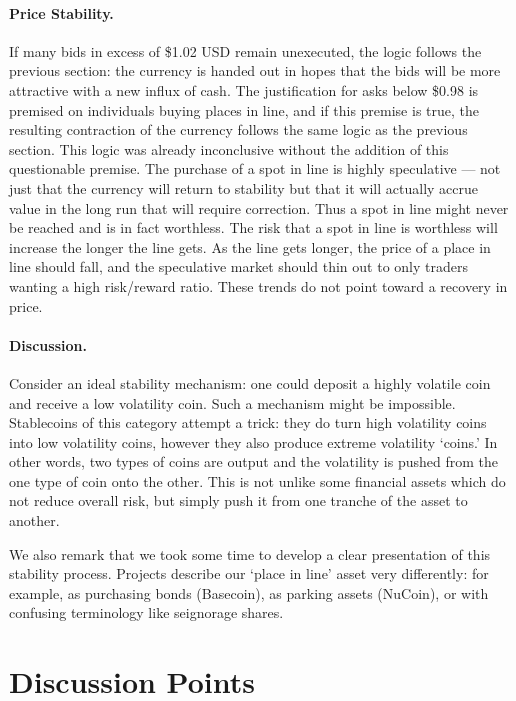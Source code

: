 \paragraph{Price Stability.} If many bids in excess of \$1.02 USD remain unexecuted, the logic follows the previous section: the currency is handed out in hopes that the bids will be more attractive with a new influx of cash. The justification for asks below \$0.98 is premised on individuals buying places in line, and if this premise is true, the resulting contraction of the currency follows the same logic as the previous section. This logic was already inconclusive without the addition of this questionable premise. The purchase of a spot in line is highly speculative --- not just that the currency will return to stability but that it will actually accrue value in the long run that will require correction. Thus a spot in line might never be reached and is in fact worthless. The risk that a spot in line is worthless will increase the longer the line gets. As the line gets longer, the price of a place in line should fall, and the speculative market should thin out to only traders wanting a high risk/reward ratio. These trends do not point toward a recovery in price. 

\paragraph{Discussion.} Consider an ideal stability mechanism: one could deposit a highly volatile coin and receive a low volatility coin. Such a mechanism might be impossible. Stablecoins of this category attempt a trick: they do turn high volatility coins into low volatility coins, however they also produce extreme volatility `coins.' In other words, two types of coins are output and the volatility is pushed from the one type of coin onto the other. This is not unlike some financial assets which do not reduce overall risk, but simply push it from one tranche of the asset to another.

We also remark that we took some time to develop a clear presentation of this stability process. Projects describe our `place in line' asset very differently: for example, as purchasing bonds (Basecoin), as parking assets (NuCoin), or with confusing terminology like seignorage shares. %



\section{Discussion Points}

